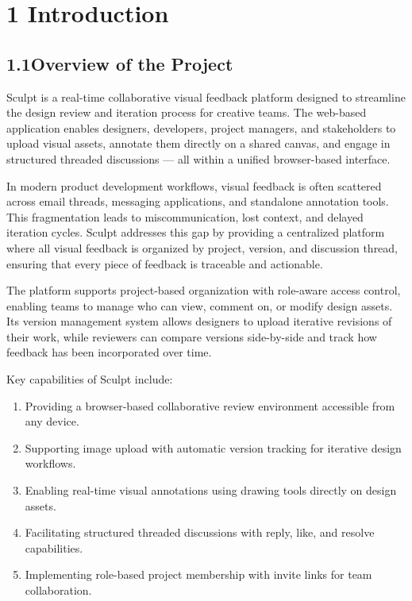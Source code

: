 \documentclass[12pt,a4paper]{article}
\begin{document}
\tableofcontents
\newpage
{}

\section{1 Introduction}

\subsection{1.1\quad Overview of the Project}

Sculpt is a real-time collaborative visual feedback platform designed to streamline the design review and iteration process for creative teams. The web-based application enables designers, developers, project managers, and stakeholders to upload visual assets, annotate them directly on a shared canvas, and engage in structured threaded discussions --- all within a unified browser-based interface.

In modern product development workflows, visual feedback is often scattered across email threads, messaging applications, and standalone annotation tools. This fragmentation leads to miscommunication, lost context, and delayed iteration cycles. Sculpt addresses this gap by providing a centralized platform where all visual feedback is organized by project, version, and discussion thread, ensuring that every piece of feedback is traceable and actionable.

The platform supports project-based organization with role-aware access control, enabling teams to manage who can view, comment on, or modify design assets. Its version management system allows designers to upload iterative revisions of their work, while reviewers can compare versions side-by-side and track how feedback has been incorporated over time.

Key capabilities of Sculpt include:
\begin{enumerate}[label=\Roman*.]
    \item Providing a browser-based collaborative review environment accessible from any device.
    \item Supporting image upload with automatic version tracking for iterative design workflows.
    \item Enabling real-time visual annotations using drawing tools directly on design assets.
    \item Facilitating structured threaded discussions with reply, like, and resolve capabilities.
    \item Implementing role-based project membership with invite links for team collaboration.
\end{enumerate}
\end{document}
